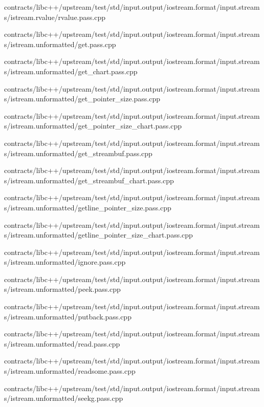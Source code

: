 \begin{DoxyCompactItemize}
contracts/libc++/upstream/test/std/input.\+output/iostream.\+format/input.\+streams/istream.\+rvalue/rvalue.\+pass.\+cpp\item 
contracts/libc++/upstream/test/std/input.\+output/iostream.\+format/input.\+streams/istream.\+unformatted/get.\+pass.\+cpp\item 
contracts/libc++/upstream/test/std/input.\+output/iostream.\+format/input.\+streams/istream.\+unformatted/get\+\_\+chart.\+pass.\+cpp\item 
contracts/libc++/upstream/test/std/input.\+output/iostream.\+format/input.\+streams/istream.\+unformatted/get\+\_\+pointer\+\_\+size.\+pass.\+cpp\item 
contracts/libc++/upstream/test/std/input.\+output/iostream.\+format/input.\+streams/istream.\+unformatted/get\+\_\+pointer\+\_\+size\+\_\+chart.\+pass.\+cpp\item 
contracts/libc++/upstream/test/std/input.\+output/iostream.\+format/input.\+streams/istream.\+unformatted/get\+\_\+streambuf.\+pass.\+cpp\item 
contracts/libc++/upstream/test/std/input.\+output/iostream.\+format/input.\+streams/istream.\+unformatted/get\+\_\+streambuf\+\_\+chart.\+pass.\+cpp\item 
contracts/libc++/upstream/test/std/input.\+output/iostream.\+format/input.\+streams/istream.\+unformatted/getline\+\_\+pointer\+\_\+size.\+pass.\+cpp\item 
contracts/libc++/upstream/test/std/input.\+output/iostream.\+format/input.\+streams/istream.\+unformatted/getline\+\_\+pointer\+\_\+size\+\_\+chart.\+pass.\+cpp\item 
contracts/libc++/upstream/test/std/input.\+output/iostream.\+format/input.\+streams/istream.\+unformatted/ignore.\+pass.\+cpp\item 
contracts/libc++/upstream/test/std/input.\+output/iostream.\+format/input.\+streams/istream.\+unformatted/peek.\+pass.\+cpp\item 
contracts/libc++/upstream/test/std/input.\+output/iostream.\+format/input.\+streams/istream.\+unformatted/putback.\+pass.\+cpp\item 
contracts/libc++/upstream/test/std/input.\+output/iostream.\+format/input.\+streams/istream.\+unformatted/read.\+pass.\+cpp\item 
contracts/libc++/upstream/test/std/input.\+output/iostream.\+format/input.\+streams/istream.\+unformatted/readsome.\+pass.\+cpp\item 
contracts/libc++/upstream/test/std/input.\+output/iostream.\+format/input.\+streams/istream.\+unformatted/seekg.\+pass.\+cpp\item 

\end{DoxyCompactItemize}
